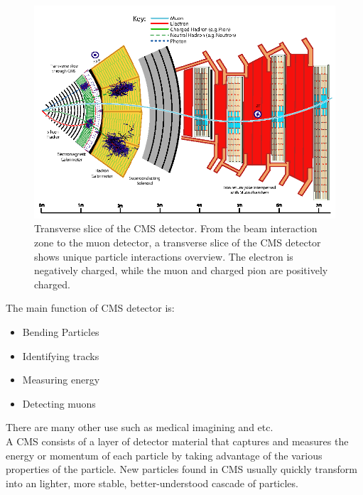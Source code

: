 \begin{figure}[H]
    \centering
    \includegraphics[scale=0.4]{Detector/Figure_001.png}
    \caption{
    Transverse slice of the CMS detector. From the beam interaction zone to the muon detector, a transverse slice of the CMS detector shows unique particle interactions overview. The electron is negatively charged, while the muon and charged pion are positively charged.\cite{CMS_3}}
    \label{fig:my_label_CMS}
\end{figure}

The main function of CMS detector is:
\begin{itemize}
    \item Bending Particles
    \item Identifying tracks
    \item Measuring energy
    \item Detecting muons
\end{itemize}
There are many other use such as medical imagining and etc.\\
A CMS consists of a layer of detector material that captures and measures the energy or momentum of each particle by taking advantage of the various properties of the particle. New particles found in CMS usually quickly transform into an lighter, more stable, better-understood cascade of particles.




